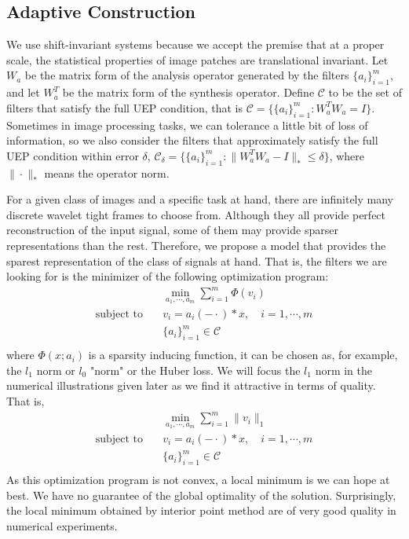 \documentclass[a4paper]{article}
\begin{document}
\subsection{Adaptive Construction}
We use shift-invariant systems because we accept the premise that at a proper scale, the statistical properties of image patches are translational invariant. Let $W_a$ be the matrix form of the analysis operator generated by the filters $\{a_i\}_{i=1}^m$, and let $W^T_a$ be the matrix form of the synthesis operator. Define $\mathcal{C}$ to be the set of filters that satisfy the full UEP condition, that is $\mathcal{C}=\{ \{a_i\}_{i=1}^m : W_a^TW_a=I\}$. Sometimes in image processing tasks, we can tolerance a little bit of loss of information, so we also consider the filters that approximately satisfy the full UEP condition within error $\delta$, $\mathcal{C}_\delta = \{\{a_i\}_{i=1}^m : \|W_a^TW_a -I\|_*\leq \delta\}$, where $\| \cdot \|_*$ means the operator norm.

For a given class of images and a specific task at hand, there are infinitely many discrete wavelet tight frames to choose from. Although they all provide perfect reconstruction of the input signal, some of them may provide sparser representations than the rest. Therefore, we propose a model that provides the sparest representation of the class of signals at hand. That is, the filters we are looking for is the minimizer of the following optimization program:
\begin{equation}
	\begin{aligned}
		&\min_{a_1,\cdots,a_m} \sum_{i=1}^m\Phi(v_i) \\
		\textrm{subject to} \quad&v_i = a_i(-\cdot)*x,\quad i=1,\cdots,m\\
		 & \{a_i\}_{i=1}^m \in \mathcal{C} \\
	\end{aligned}
\end{equation}
where $\Phi(x;a_i)$ is a sparsity inducing function, it can be chosen as, for example, the $l_1$ norm or $l_0$ "norm" or the Huber loss. We will focus the $l_1$ norm in the numerical illustrations given later as we find it attractive in terms of quality. That is,
\begin{equation}
\label{model:m0}
	\begin{aligned}
		&\min_{a_1,\cdots,a_m} \sum_{i=1}^m \|v_i\|_1 \\
		\textrm{subject to} \quad&v_i = a_i(-\cdot)*x,\quad i=1,\cdots,m\\
		 & \{a_i\}_{i=1}^m \in \mathcal{C} \\
	\end{aligned}
\end{equation}
As this optimization program is not convex, a local minimum is we can hope at best. We have no guarantee of the global optimality of the solution. Surprisingly, the local minimum obtained by interior point method are of very good quality in numerical experiments.
\end{document}
